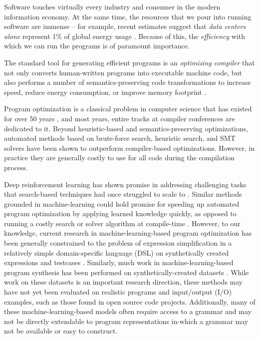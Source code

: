 \documentclass{article}
\begin{document}
Software touches virtually every industry and consumer in the modern information economy.
At the same time, the resources that we pour into running software are immense -- for example, recent estimates suggest that \emph{data centers alone} represent 1\% of global energy usage \citep{masanet2020recalibrating}.
Because of this, the \emph{efficiency} with which we can run the programs is of paramount importance.

The standard tool for generating efficient programs is an \emph{optimizing compiler} that not only converts human-written programs into executable machine code, but also performs a number of semantics-preserving code transformations to increase speed, reduce energy consumption, or improve memory footprint \citep{dragonbook}.

Program optimization is a classical problem in computer science that has existed for over 50 years \cite{mckeeman1965peephole, allen1971}, and most years, entire tracks at compiler conferences are dedicated to it.   Beyond heuristic-based and semantics-preserving optimizations, automated methods based on brute-force search, heuristic search, and SMT solvers have been shown to outperform compiler-based optimizations. However, in practice they are generally  costly to use for all code during the compilation process. 

Deep reinforcement learning has shown promise in addressing challenging tasks that search-based techniques had once struggled to scale to \cite{silver2017mastering}. Similar methods grounded in machine-learning  could hold promise for speeding up automated program optimization by applying learned knowledge quickly, as opposed to running a costly search or solver algorithm at compile-time . However, to our knowledge, current research in machine-learning-based program optimization has been generally constrained to the problem of expression simplification in a relatively simple domain-specific language (DSL) on synthetically created expressions and testcases \cite{shi2020}. Similarly, much work in machine-learning-based program synthesis  has been performed on synthetically-created datasets \cite{parisotto2016neuro,bunel2018leveraging}. While work on these datasets is an important research direction, these methods may have not yet been evaluated on realistic programs and input/output (I/O) examples, such as those found in open source code projects. Additionally, many of these machine-learning-based models often require access to a grammar and may not be directly extendable to program representations in-which a grammar may not be available or easy to construct.
\end{document}

